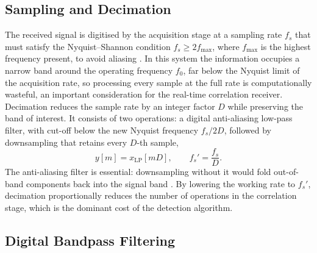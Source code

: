 \subsection{Sampling and Decimation}
\label{sec:decimation}

The received signal is digitised by the acquisition stage at a sampling rate
$f_s$ that must satisfy the Nyquist--Shannon condition $f_s \ge 2 f_{\max}$, where
$f_{\max}$ is the highest frequency present, to avoid aliasing \cite{lyons2011}.
In this system the information occupies a narrow band around the operating
frequency $f_0$, far below the Nyquist limit of the acquisition rate, so
processing every sample at the full rate is computationally wasteful, an important
consideration for the real-time correlation receiver.
\newp
Decimation reduces the sample rate by an integer factor $D$ while preserving the
band of interest. It consists of two operations: a digital anti-aliasing low-pass
filter, with cut-off below the new Nyquist frequency $f_s/2D$, followed by
downsampling that retains every $D$-th sample,
\begin{equation}
    y[m] = x_{\mathrm{LP}}[mD], \qquad f_s' = \frac{f_s}{D}.
    \label{eq:decimation}
\end{equation}
The anti-aliasing filter is essential: downsampling without it would fold
out-of-band components back into the signal band \cite{lyons2011}. By lowering the
working rate to $f_s'$, decimation proportionally reduces the number of operations
in the correlation stage, which is the dominant cost of the detection algorithm.


\subsection{Digital Bandpass Filtering}
\label{sec:filtering}

